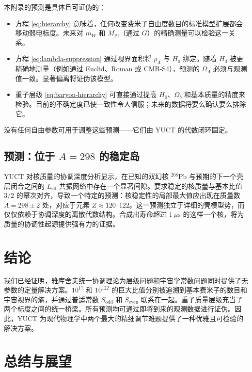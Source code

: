 \documentclass[11pt,a4paper]{article}
\theoremstyle{remark}
\begin{document}
	本附录的预测是具体且可证伪的：
	\begin{itemize}
		\item 方程 \eqref{eq:hierarchy} 意味着，任何改变费米子自由度数目的标准模型扩展都会移动弱电标度。未来对 \(m_W\) 和 \(M_{\mathrm{Pl}}\)（通过 \(G\)）的精确测量可以检验这一关系。
		\item 方程 \eqref{eq:lambda-suppression} 通过视界面积将 \(\rho_\Lambda\) 与 \(H_0\) 绑定。随着 \(H_0\) 被更精确地测量（例如通过 Euclid、Roman 或 CMB‑S4），预测的 \(\Omega_\Lambda\) 必须与观测值一致。显著偏离将证伪该模型。
		\item 重子层级 \eqref{eq:baryon-hierarchy} 可直接通过提高 \(H_0\)、\(\Omega_b\) 和基本质量的精度来检验。目前的不确定度已使一致性令人信服；未来的数据将要么确认要么排除它。
	\end{itemize}
	没有任何自由参数可用于调整这些预测——它们由 YUCT 的代数闭环固定。
	
	\subsection{预测：位于 \(A=298\) 的稳定岛}
	
	YUCT 对核质量的协调深度分析显示，在已知的双幻核 \(^{208}\mathrm{Pb}\) 与预期的下一个壳层闭合之间的 \(L_{\mathrm{eff}}\) 共振网络中存在一个显著间隙。要求稳定的核质量与基本比值 \(3/2\) 的幂次对齐，导致一个特定的预测：核稳定性的局部最大值应出现在质量数 \(A = 298 \pm 2\) 处，对应于元素 \(Z \approx 120\)--\(122\)。这一预测独立于详细的壳模型势，而仅仅依赖于协调深度的离散代数结构。合成出寿命超过 \(1\ \mu\text{s}\) 的这样一个核，将为质量的协调性起源提供强有力的证据。
	
	\section{结论}
	
	我们已经证明，雅库舍夫统一协调理论为层级问题和宇宙学常数问题同时提供了无参数的定量解决方案。\(10^{17}\) 和 \(10^{122}\) 的巨大比值分别被追溯到基本费米子的数目和宇宙视界的熵，并通过普适常数 \(S_{\mathrm{odd}}\) 和 \(S_{\mathrm{even}}\) 联系在一起。重子质量层级充当了两个标度之间的统一桥梁。所有预测均可通过即将到来的观测数据进行证伪。因此，YUCT 为现代物理学中两个最大的精细调节难题提供了一种优雅且可检验的解决方案。
	
	\section*{总结与展望}
	
\end{document}
